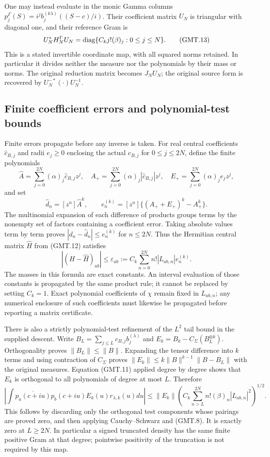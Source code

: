 One may instead evaluate in the monic Gamma columns
$p_j^\Gamma(S)=i^j b_j^{(k\lambda)}((S-c)/i)$.
Their coefficient matrix $U_N$ is triangular with diagonal one,
and their reference Gram is
\[
 U_N^*H_N^\Gamma U_N
       =\operatorname{diag}\{C_kj!(\beta)_j:0\le j\le N\}.                  \tag{GMT.13}
\]
This is a stated invertible coordinate map, with all squared norms
retained. In particular it divides neither the measure nor the polynomials
by their mass or norms. The original reduction matrix becomes $J_NU_N$;
the original source form is recovered by $U_N^{-*}(\cdot)U_N^{-1}$.

\subsection{Finite coefficient errors and polynomial-test bounds}

Finite errors propagate before any inverse is taken. For real central
coefficients $\widehat c_{B,j}$ and radii $e_j\ge0$ enclosing the actual
$c_{B,j}$ for $0\le j\le2N$, define the finite polynomials
\[
 \widehat A=\sum_{j=0}^{2N}(\alpha)_j\widehat c_{B,j}z^j,
 \quad A_+=\sum_{j=0}^{2N}(\alpha)_j|\widehat c_{B,j}|z^j,
 \quad E_+=\sum_{j=0}^{2N}(\alpha)_je_jz^j,
\]
and set
\[
 \widehat d_n=[z^n]\widehat A^k,\qquad
 e^{(k)}_n=[z^n]\{(A_++E_+)^k-A_+^k\}.                         \tag{GMT.14}
\]
The multinomial expansion of each difference of products groups terms
by the nonempty set of factors containing a coefficient error. Taking
absolute values term by term proves
$|d_n-\widehat d_n|\le e^{(k)}_n$ for $n\le2N$. Thus the Hermitian
central matrix $\widehat H$ from (GMT.12) satisfies
\[
 |(H-\widehat H)_{ab}|\le
 \varepsilon_{ab}:=C_k\sum_{n=0}^{2N}n!|L_{ab,n}|e^{(k)}_n.
                                                                    \tag{GMT.15}
\]
The masses in this formula are exact constants. An interval evaluation
of those constants is propagated by the same product rule; it cannot
be replaced by setting $C_k=1$. Exact polynomial coefficients of
$\chi$ remain fixed in $L_{ab,n}$; any numerical enclosure of such
coefficients must likewise be propagated before reporting a matrix
certificate.

There is also a strictly polynomial-test refinement of the $L^2$ tail
bound in the supplied descent. Write
$B_L=\sum_{j\le L}c_{B,j}b_j^{(\lambda)}$ and
$E_k=B_k-C_\Sigma(B_L^{\otimes k})$. Orthogonality proves
$\|B_L\|\le\|B\|$. Expanding the tensor difference into $k$ terms
and using contraction of $C_\Sigma$ proves
$\|E_k\|\le k\|B\|^{k-1}\|B-B_L\|$ with the original measures.
Equation (GMT.11) applied degree by degree shows that $E_k$ is
orthogonal to all polynomials of degree at most $L$. Therefore
\[
 \left|\int\overline{p_a(c+iu)}p_b(c+iu)E_k(u)r_{\lambda,k}(u)du\right|
 \le\|E_k\|
 \left(C_k\sum_{n>L}^{2N}n!(\beta)_n|L_{ab,n}|^2\right)^{1/2}.
                                                                    \tag{GMT.16}
\]
This follows by discarding only the orthogonal test components whose
pairings are proved zero, and then applying Cauchy--Schwarz and
(GMT.8). It is exactly zero at $L\ge2N$. In particular a signed
truncated density has the same finite positive Gram at that degree;
pointwise positivity of the truncation is not required by this map.

